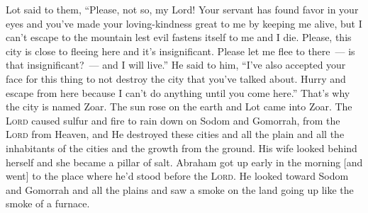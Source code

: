 \begin{inparaenum}
     Lot said to them, ``Please, not so, my Lord!%
     Your servant has found favor in your eyes and you've made your loving-kindness great to me by keeping me alive, but I can't escape to the mountain lest evil fastens itself to me and I die.%
     Please, this city is close to fleeing here and it's insignificant. Please let me flee to there~--- is that insignificant?~--- and I will live.''%
     He said to him, ``I've also accepted your face for this thing to not destroy the city that you've talked about.%
     Hurry and escape from here because I can't do anything until you come here.'' That's why the city is named Zoar.%
     The sun rose on the earth and Lot came into Zoar.%
     The \textsc{Lord} caused sulfur and fire to rain down on Sodom and Gomorrah, from the \textsc{Lord} from Heaven,%
     and He destroyed these cities and all the plain and all the inhabitants of the cities and the growth from the ground.%
     His wife looked behind herself and she became a pillar of salt.%
     Abraham got up early in the morning [and went] to the place where he'd stood before the \textsc{Lord}.%
     He looked toward Sodom and Gomorrah and all the plains and saw a smoke on the land going up like the smoke of a furnace.%
    

\end{inparaenum}
